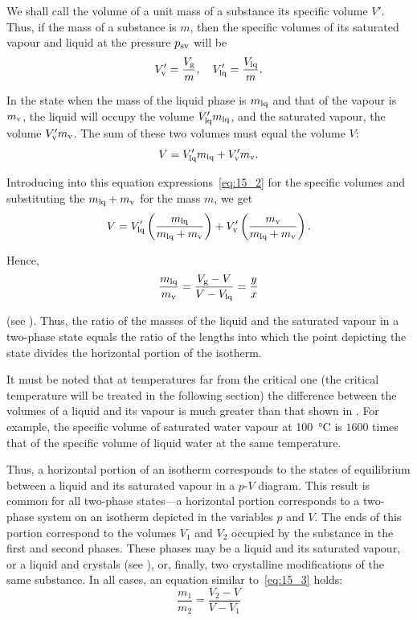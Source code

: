 We shall call the volume of a unit mass of a substance its specific volume $V'$. Thus, if the mass of a substance is $m$, then the specific volumes of its saturated vapour and liquid at the pressure $p_{\text{sv}}$ will be
\begin{equation}\label{eq:15_2}
    V_{\text{v}}' = \frac{V_{\text{g}}}{m},\quad V_{\text{lq}}' = \frac{V_{\text{lq}}}{m}.
\end{equation}

\noindent
In the state when the mass of the liquid phase is $m_{\text{lq}}$ and that of the vapour is $m_{\text{v}}$, the liquid will occupy the volume $V_{\text{lq}}'m_{\text{lq}}$, and the saturated vapour, the volume $V_{\text{v}}'m_{\text{v}}$. The sum of these two volumes must equal the volume $V$:
\begin{equation*}
    V = V_{\text{lq}}'m_{\text{lq}} + V_{\text{v}}'m_{\text{v}}.
\end{equation*}

\noindent
Introducing into this equation expressions~\eqref{eq:15_2} for the specific volumes and substituting the $m_{\text{lq}}+m_{\text{v}}$ for the mass $m$, we get
\begin{equation*}
    V = V_{\text{lq}}' \left(\frac{m_{\text{lq}}}{m_{\text{lq}}+m_{\text{v}}}\right) + V_{\text{v}}' \left(\frac{m_{\text{v}}}{m_{\text{lq}}+m_{\text{v}}}\right).
\end{equation*}

\noindent
Hence,
\begin{equation}\label{eq:15_3}
    \frac{m_{\text{lq}}}{m_{\text{v}}} = \frac{V_{\text{g}} - V}{V - V_{\text{lq}}} = \frac{y}{x}
\end{equation}

\noindent
(see ). Thus, the ratio of the masses of the liquid and the saturated vapour in a two-phase state equals the ratio of the lengths into which the point depicting the state divides the horizontal portion of the isotherm.

It must be noted that at temperatures far from the critical one (the critical temperature will be treated in the following section) the difference between the volumes of a liquid and its vapour is much greater than that shown in . For example, the specific volume of saturated water vapour at \SI{100}{\degreeCelsius} is $1600$ times that of the specific volume of liquid water at the same temperature.

Thus, a horizontal portion of an isotherm corresponds to the states of equilibrium between a liquid and its saturated vapour in a $p$-$V$ diagram. This result is common for all two-phase states---a horizontal portion corresponds to a two-phase system on an isotherm depicted in the variables $p$ and $V$. The ends of this portion correspond to the volumes $V_1$ and $V_2$ occupied by the substance in the first and second phases. These phases may be a liquid and its saturated vapour, or a liquid and crystals (see ), or, finally, two crystalline modifications of the same substance. In all cases, an equation similar to~\eqref{eq:15_3} holds:
\begin{equation*}
    \frac{m_1}{m_2} = \frac{V_2 - V}{V - V_1}
\end{equation*}

